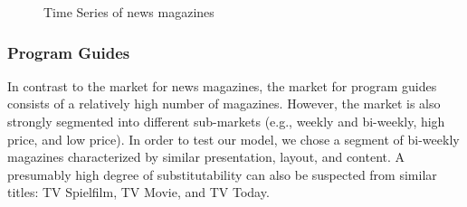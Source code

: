 \documentclass[12pt,a4paper,notitlepage]{article}
\begin{document}
\begin{figure}[H]\centering
\caption{Time Series of news magazines}
	\label{fig_fss}
\end{figure}



\subsubsection{Program Guides}

In contrast to the market for news magazines, the market for program guides consists of a relatively high number of magazines. However, the market is also strongly segmented into different sub-markets (e.g., weekly and bi-weekly, high price, and low price). In order to test our model, we chose a segment of bi-weekly magazines characterized by similar presentation, layout, and content. A presumably high degree of substitutability can also be suspected from similar titles: TV Spielfilm, TV Movie, and TV Today.  
\end{document}
